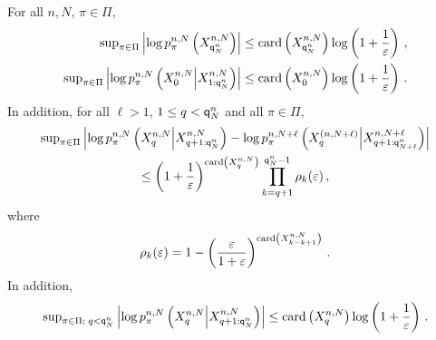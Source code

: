 \begin{lemma}
\label{lem:exp:forget}
For all $n,N$, $\pi\in\Pi$,
\begin{align}
\mathrm{sup}_{\pi\in\Pi}\left|\log p_{\pi}^{n,N}\left(X_{{\mathsf{q}}^{n}_{N}}^{n,N}\right)\right|&\le \mathrm{card}\left(X_{{\mathsf{q}}^{n}_{N}}^{n,N}\right)\log \left(1+\frac{1}{\varepsilon}\right)\,,\label{eq:bound:beg}\\
\mathrm{sup}_{\pi\in\Pi}\left|\log p_{\pi}^{n,N}\left(X_{0}^{n,N}\middle|X_{1:{\mathsf{q}}^{n}_{N}}^{n,N}\right)\right|&\le \mathrm{card}\left(X_{0}^{n,N}\right)\log \left(1+\frac{1}{\varepsilon}\right)\label{eq:bound:end}\,.
\end{align}
In addition,  for all $\ell>1$,  $1\le q< {\mathsf{q}}^{n}_{N}$ and all $\pi\in\Pi$,
\begin{multline}
\mathrm{sup}_{\pi\in\Pi}\left|\log p_{\pi}^{n,N}\left(X_{q}^{n,N}\middle|X_{q+1:{\mathsf{q}}^{n}_{N}}^{n,N}\right) - \log p_{\pi}^{n,N+\ell}\left(X_{q}^{(n,N+\ell)}\middle|X_{q+1:{\mathsf{q}}^{n}_{N+\ell}}^{n,N+\ell}\right) \right|\\
\leq \left(1+\frac{1}{\varepsilon}\right)^{\mathrm{card}\left(X^{n,N}_{q}\right)}\prod_{k=q+1}^{{\mathsf{q}}^{n}_{N}-1}\rho_k(\varepsilon) \,,\label{eq:bound:forget}
\end{multline}
where
\begin{equation}
\label{eq:defrho}
\rho_k(\varepsilon) = 1-\left(\frac{\varepsilon}{1+\varepsilon}\right)^{\mathrm{card}\left(X^{n,N}_{k- k+1}\right)}\,.
\end{equation}
In addition,
\begin{equation}
\label{eq:bound:loglik}
\mathrm{sup}_{\pi\in\Pi;\;q< {\mathsf{q}}^{n}_{N}}\left|\log p_{\pi}^{n,N}\left(X_{q}^{n,N}\middle|X_{q+1:{\mathsf{q}}^{n}_{N}}^{n,N}\right)\right|\le \mathrm{card}\left(X_{q}^{n,N}\right)\log \left(1+\frac{1}{\varepsilon}\right)\,. 
\end{equation}
\end{lemma}

